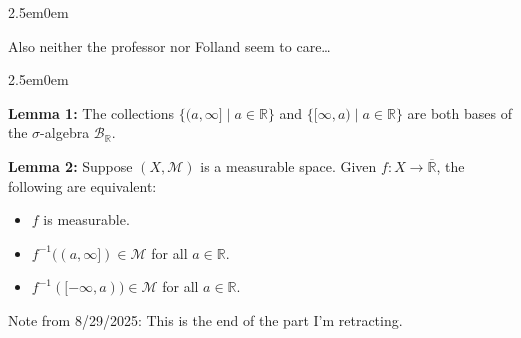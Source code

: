\documentclass{book}
\newcommand{\hTwo}{%
\color{MidnightBlue}%
   \fontsize{13}{15}\selectfont%
}
\newcommand{\myComment}{%
   \color{RawerSienna}%
   \fontsize{12}{14}\selectfont%
}
\newenvironment{myIndent}{%
   \begin{adjustwidth}{2.5em}{0em}%
}{%
   \end{adjustwidth}%
}
\newcommand{\blab}[1]{\textbf{#1}}
\newcommand{\mySepTwo}[1][.]{%
   {\noindent\color{#1}{\rule{6.5in}{0.5mm}}}\\%
}
\newcommand{\retTwo}{\hfill\bigbreak}
\begin{document}
\begin{myIndent}\myComment
   Also neither the professor nor Folland seem to care\dots
\end{myIndent}

\begin{myIndent}\hTwo 
   \blab{Lemma 1:} The collections $\{(a, \infty] \mid a \in \mathbb{R}\}$ and $\{[\infty, a) \mid a \in \mathbb{R}\}$ are both bases of the $\sigma$-algebra $\mathcal{B}_{\mathbb{R}}$.\retTwo

   \blab{Lemma 2:} Suppose $(X, \mathcal{M})$ is a measurable space. Given $f: X \longrightarrow \overline{\mathbb{R}}$, the\\ following are equivalent:
   \begin{itemize}
      \item $f$ is measurable.
      \item $f^{-1}((a, \infty]) \in \mathcal{M}$ for all $a \in \mathbb{R}$.
      \item $f^{-1}([-\infty, a)) \in \mathcal{M}$ for all $a \in \mathbb{R}$.\retTwo
   \end{itemize}
\end{myIndent}

\myComment Note from 8/29/2025: This is the end of the part I'm retracting.

\mySepTwo
\end{document}
